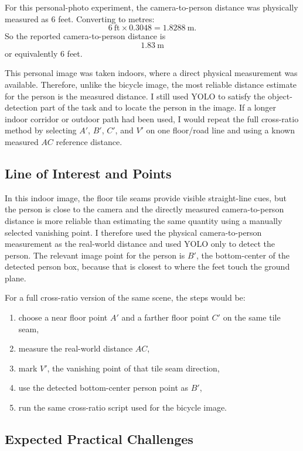 \documentclass[11pt]{article}
\begin{document}
For this personal-photo experiment, the camera-to-person distance was physically measured as \(6\) feet. Converting to metres:
\[
6\ \text{ft}\times 0.3048 = 1.8288\ \text{m}.
\]
So the reported camera-to-person distance is
\[
\boxed{1.83\ \text{m}}
\]
or equivalently \(6\) feet.

This personal image was taken indoors, where a direct physical measurement was available. Therefore, unlike the bicycle image, the most reliable distance estimate for the person is the measured distance. I still used YOLO to satisfy the object-detection part of the task and to locate the person in the image. If a longer indoor corridor or outdoor path had been used, I would repeat the full cross-ratio method by selecting \(A'\), \(B'\), \(C'\), and \(V'\) on one floor/road line and using a known measured \(AC\) reference distance.

\subsection{Line of Interest and Points}

In this indoor image, the floor tile seams provide visible straight-line cues, but the person is close to the camera and the directly measured camera-to-person distance is more reliable than estimating the same quantity using a manually selected vanishing point. I therefore used the physical camera-to-person measurement as the real-world distance and used YOLO only to detect the person. The relevant image point for the person is \(B'\), the bottom-center of the detected person box, because that is closest to where the feet touch the ground plane.

For a full cross-ratio version of the same scene, the steps would be:
\begin{enumerate}
    \item choose a near floor point \(A'\) and a farther floor point \(C'\) on the same tile seam,
    \item measure the real-world distance \(AC\),
    \item mark \(V'\), the vanishing point of that tile seam direction,
    \item use the detected bottom-center person point as \(B'\),
    \item run the same cross-ratio script used for the bicycle image.
\end{enumerate}

\subsection{Expected Practical Challenges}
\end{document}
